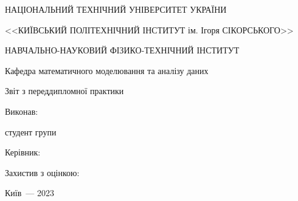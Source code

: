 \thispagestyle{empty}

\begin{center}
НАЦІОНАЛЬНИЙ ТЕХНІЧНИЙ УНІВЕРСИТЕТ УКРАЇНИ \par
<<КИЇВСЬКИЙ ПОЛІТЕХНІЧНИЙ ІНСТИТУТ ім. Ігоря СІКОРСЬКОГО>>\par
НАВЧАЛЬНО-НАУКОВИЙ ФІЗИКО-ТЕХНІЧНИЙ ІНСТИТУТ\par
Кафедра математичного моделювання та аналізу даних

\vfill
{\huge Звіт з переддипломної практики \par}
\vspace{5mm}
\large\MakeUppercase{\textbf{\reportTitle}} \par
\end{center}

\vfill
\begin{flushright}
Виконав:

студент групи \reportAuthorGroup

\reportAuthor

\vspace{20mm}
Керівник:

\supervisorRegalia

\supervisorFio

\vspace{20mm}
Захистив з оцінкою:

\end{flushright}

\vspace{20mm}
\begin{center}
{Київ~--- 2023}
\end{center}

\newpage
\thispagestyle{plain}
